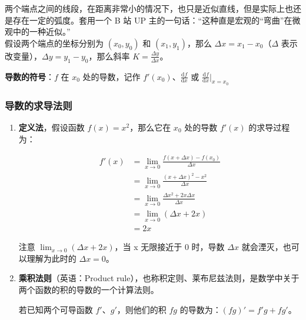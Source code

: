 两个端点之间的线段，在距离非常小的情况下，也只是近似直线，但是实际上也还是存在一定的弧度。套用一个 B 站 UP 主的一句话：“这种直是宏观的“弯曲”在微观中的一种近似。”\\
假设两个端点的坐标分别为 $(x_0, y_0)$ 和 $(x_1, y_1)$，那么 $\Delta x = x_1 - x_0$（$\Delta$ 表示改变量），$\Delta y = y_1 - y_0$，那么斜率 $K = \frac{\Delta y}{\Delta x}$。

\begin{center}
\end{center}

\textbf{导数的符号}：$f$ 在 $x_0$ 处的导数，记作 $f'(x_0)$、$\frac{\mathrm{d}f}{\mathrm{d}x}$ 或 $\frac{\mathrm{d}f}{\mathrm{d}x}|_{x=x_0}$

\subsubsection{导数的求导法则}
\begin{enumerate}
	\item \textbf{定义法}，假设函数 $f(x) = x^2$，那么它在 $x_0$ 处的导数 $f'(x)$ 的求导过程为：

	      \[
		      \begin{aligned}
			      f'(x) & = \lim_{x \to 0} \frac {f(x + \Delta x) - f(x_0)}{\Delta x} \\
			            & = \lim_{x \to 0} \frac {(x + \Delta x)^2 - x^2}{\Delta x}   \\
			            & = \lim_{x \to 0} \frac {\Delta x^2 + 2x \Delta x}{\Delta x} \\
			            & = \lim_{x \to 0} (\Delta x + 2x)                            \\
			            & = 2x
		      \end{aligned}
	      \]

	      注意 $\lim_{x \to 0} (\Delta x + 2x)$，当 x 无限接近于 0 时，导数 $\Delta x$ 就会湮灭，也可以理解为此时的 $\Delta x = 0$。

	\item \textbf{乘积法则}（英语：Product rule），也称积定则、莱布尼兹法则，是数学中关于两个函数的积的导数的一个计算法则。

	      若已知两个可导函数 $f'$、$g'$，则他们的积 $fg$ 的导数为：$(fg)' = f'g + fg'$。
\end{enumerate}

